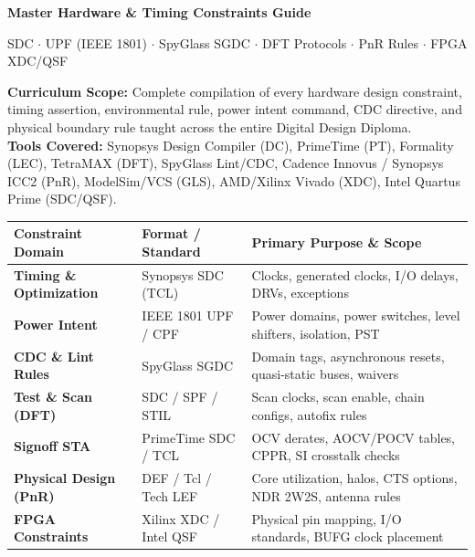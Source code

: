 \documentclass[11pt,a4paper]{article}
\begin{document}
\begin{titlepage}
  \centering
  \vspace*{1.0cm}
  {\Huge\bfseries\sffamily\color{primary} Master Hardware \& Timing Constraints Guide\par}
  \vspace{0.4cm}
  {\Large\sffamily\color{mutedgray} SDC $\cdot$ UPF (IEEE 1801) $\cdot$ SpyGlass SGDC $\cdot$ DFT Protocols $\cdot$ PnR Rules $\cdot$ FPGA XDC/QSF\par}
  \vspace{0.8cm}
  
  \begin{mdframed}[style=cmdstyle]
    \centering\small\sffamily
    \textbf{Curriculum Scope:} Complete compilation of every hardware design constraint, timing assertion, environmental rule, power intent command, CDC directive, and physical boundary rule taught across the entire Digital Design Diploma.\\[4pt]
    \textbf{Tools Covered:} Synopsys Design Compiler (DC), PrimeTime (PT), Formality (LEC), TetraMAX (DFT), SpyGlass Lint/CDC, Cadence Innovus / Synopsys ICC2 (PnR), ModelSim/VCS (GLS), AMD/Xilinx Vivado (XDC), Intel Quartus Prime (SDC/QSF).
  \end{mdframed}

  \vspace{0.8cm}

  \begin{table}[h!]
    \centering\small
    \begin{tabular}{p{3.8cm} p{3.2cm} p{7.5cm}}
      \toprule
      \textbf{Constraint Domain} & \textbf{Format / Standard} & \textbf{Primary Purpose \& Scope} \\
      \midrule
      \textbf{Timing \& Optimization} & Synopsys SDC (TCL) & Clocks, generated clocks, I/O delays, DRVs, exceptions \\
      \textbf{Power Intent} & IEEE 1801 UPF / CPF & Power domains, power switches, level shifters, isolation, PST \\
      \textbf{CDC \& Lint Rules} & SpyGlass SGDC & Domain tags, asynchronous resets, quasi-static buses, waivers \\
      \textbf{Test \& Scan (DFT)} & SDC / SPF / STIL & Scan clocks, scan enable, chain configs, autofix rules \\
      \textbf{Signoff STA} & PrimeTime SDC / TCL & OCV derates, AOCV/POCV tables, CPPR, SI crosstalk checks \\
      \textbf{Physical Design (PnR)} & DEF / Tcl / Tech LEF & Core utilization, halos, CTS options, NDR 2W2S, antenna rules \\
      \textbf{FPGA Constraints} & Xilinx XDC / Intel QSF & Physical pin mapping, I/O standards, BUFG clock placement \\
      \bottomrule
    \end{tabular}
  \end{table}


\end{titlepage}
\end{document}
